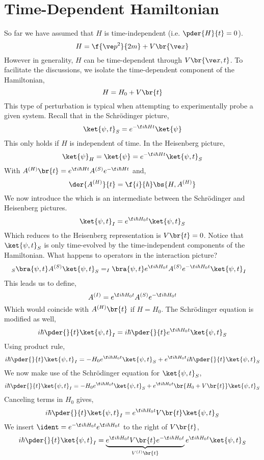 \documentclass{article}
\begin{document}
\section{Time-Dependent Hamiltonian}
So far we have assumed that $H$ is time-independent (i.e. $\pder{H}{t} = 0$).
\[ H = \f{\ve p^2}{2m} + V\br{\ve x} \]
However in generality, $H$ can be time-dependent through $V\br{\ve x, t}$. To facilitate the discussions, we isolate the time-dependent component of the Hamiltonian,
\[ H = H_0 + V\br{t} \]
This type of perturbation is typical when attempting to experimentally probe a given system. Recall that in the Schrödinger picture,
\[ \ket{\psi, t}_S = e^{- \f i \hbar H t}\ket{\psi} \]
This only holds if $H$ is independent of time. In the Heisenberg picture,
\[ \ket{\psi}_H = \ket{\psi} = e^{- \f i \hbar H t} \ket{\psi, t}_S \]
With $A^{(H)}\br{t} = e^{\f i \hbar H t} A^{(S)} e^{-\f i \hbar H t}$ and,
\[ \der{A^{(H)}}{t} = \f{i}{\hbar} \bs{H, A^{(H)}} \]
We now introduce the  which is an intermediate between the Schrödinger and Heisenberg pictures.
\[ \ket{\psi, t}_I = e^{\f i \hbar H_0 t} \ket{\psi, t}_S \]
Which reduces to the Heisenberg representation is $V\br{t} = 0$. Notice that $\ket{\psi, t}_S$ is only time-evolved by the time-independent components of the Hamiltonian. What happens to operators in the interaction picture?
\begin{align*}
    _S\bra{\psi, t} A^{(S)} \ket{\psi, t}_S
    &= _I\bra{\psi, t} e^{\f i \hbar H_0 t}A^{(S)} e^{-\f i \hbar H_0 t} \ket{\psi, t}_I
\end{align*}
This leads us to define,
\[ A^{(I)} = e^{\f i \hbar H_0 t}A^{(S)} e^{-\f i \hbar H_0 t} \]
Which would coincide with $A^{(H)}\br{t}$ if $H = H_0$. The Schrödinger equation is modified as well,
\[ i \hbar \pder{}{t} \ket{\psi, t}_I = i \hbar \pder{}{t} e^{\f i \hbar H_0 t} \ket{\psi, t}_S \]
Using product rule,
\[ i \hbar \pder{}{t} \ket{\psi, t}_I = - H_0 e^{\f i \hbar H_0 t} \ket{\psi, t}_S + e^{\f i \hbar H_0 t} i \hbar \pder{}{t} \ket{\psi, t}_S \]
We now make use of the Schrödinger equation for $\ket{\psi, t}_S$,
\[ i \hbar \pder{}{t} \ket{\psi, t}_I = - H_0 e^{\f i \hbar H_0 t} \ket{\psi, t}_S + e^{\f i \hbar H_0 t} \br{H_0 + V\br{t}} \ket{\psi, t}_S \]
Canceling terms in $H_0$ gives,
\[ i \hbar \pder{}{t} \ket{\psi, t}_I = e^{\f i \hbar H_0 t} V\br{t} \ket{\psi, t}_S \]
We insert $\ident = e^{-\f i \hbar H_0 t} e^{\f i \hbar H_0 t}$ to the right of $V\br{t}$,
\[ i \hbar \pder{}{t} \ket{\psi, t}_I = \underbrace{e^{\f i \hbar H_0 t} V\br{t} e^{-\f i \hbar H_0 t}}_{V^{(I)}\br{t}} e^{\f i \hbar H_0 t} \ket{\psi, t}_S \]
\end{document}
